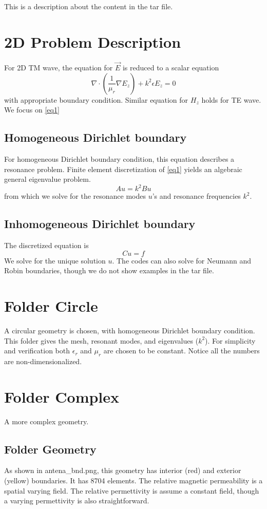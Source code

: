 \documentclass[a4paper,onecolumn]{article}
\begin{document}
\setcounter{page}{1}

\noindent This is a description about the content in the tar file.
\section{2D Problem Description}
For 2D TM wave, the equation for $\vec{E}$ is reduced to a scalar equation
\begin{equation}
    \nabla\cdot \left( \frac{1}{\mu_r} \nabla E_z \right) + k^2 \epsilon E_z = 0
    \label{eq1}
\end{equation}
with appropriate boundary condition. Similar equation for $H_z$ holds for TE wave. We focus on \eqref{eq1}\\
\subsection{Homogeneous Dirichlet boundary}
For homogeneous Dirichlet boundary condition, this equation describes a resonance problem.
Finite element discretization of \eqref{eq1} yields an algebraic general eigenvalue problem.
\begin{equation}
    Au = k^2 Bu
\end{equation}
from which we solve for the resonance modes $u$'s and resonance frequencies $k^2$.
\subsection{Inhomogeneous Dirichlet boundary}
The discretized equation is
\begin{equation}
    Cu = f
\end{equation}
We solve for the unique solution $u$.
The codes can also solve for Neumann and Robin boundaries, though we do not show examples in the tar file.
\section{Folder Circle}
A circular geometry is chosen, with homogeneous Dirichlet boundary condition. This folder gives the mesh, resonant modes, and
eigenvalues ($k^2$). For simplicity and verification both $\epsilon_r$ and $\mu_r$ are chosen to be constant. Notice all the numbers
are non-dimensionalized.
\section{Folder Complex}
A more complex geometry.
\subsection{Folder Geometry}
As shown in antena\_bnd.png, this geometry has interior (red) and exterior (yellow) boundaries. It has 8704 elements.
The relative magnetic permeability is a spatial varying field. The relative permettivity is assume a constant field, though
a varying permettivity is also straightforward.
\end{document}
